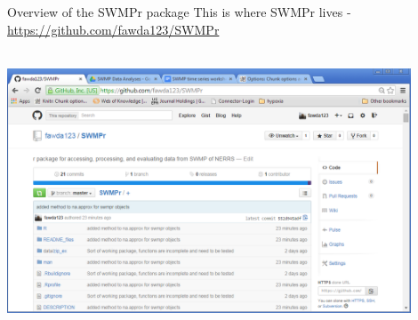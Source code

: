 \documentclass[xcolor=svgnames]{beamer}\usepackage[]{graphicx}\usepackage[]{color}
\begin{document}
\begin{frame}{Overview of the SWMPr package}
This is where SWMPr lives - \href{https://github.com/fawda123/SWMPr}{https://github.com/fawda123/SWMPr}\\~\\
\centerline{\includegraphics[width = 0.9\textwidth]{imgs/swmpr_github.png}}
\end{frame}
\end{document}
